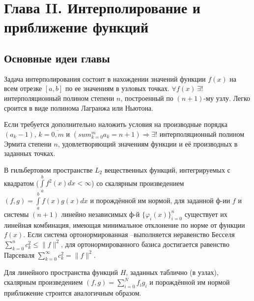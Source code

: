 \newpage
{}
\pagestyle{empty}
\vspace{0.5cm}

\section*{Глава II. Интерполирование и приближение функций}

\subsection{Основные идеи главы} 

    Задача интерполирования состоит в нахождении значений функции $f(x)$
    на всем отрезке $[a,b]$ по ее значениям в узловых точках. $\forall f(x)~\exists!$ интерполяционный полином степени $n$, построенный по $(n+1)$-му узлу. Легко сроится в виде полинома Лагранжа или Ньютона.

Если требуется дополнительно наложить условия на производные порядка $(a_k-1)$, $k = \overline{0,m}$ и $(sum_{k=0}^m a_k = n + 1) \Rightarrow \exists!$ интерполяционный полином Эрмита степени $n$, удовлетворяющий значениям функции и её производных в заданных точках.

В гильбертовом пространстве $L_2$ вещественных функций, интегрируемых с квадратом ($\int\limits_a^b{f^2(x)dx} < \infty$) со скалярным произведением $(f,g)=\int\limits_a^b{f(x)g(x)dx}$ и порождённой им нормой, для заданной ф-ии $f$ и системы $(n+1)$ линейно независимых ф-й $\{\varphi_i(x)\}_{i=0}^n$ существует их линейная комбинация, имеющая минимальное отклонение по норме от функции $f(x)$. Если система ортонормированная –выполняется неравенство Бесселя $\sum_{k=0}^n c_k^2 \leqslant \|f\|^2$, для ортонормированного базиса достигается равенство Парсеваля $\sum_{k=0}^\infty c_k^2 = \|f\|^2.$

Для линейного пространства функций $H$, заданных таблично (в узлах),  скалярным произведением $(f,g) = \sum\limits_{i=0}^N f_i g_i$ и порождённой им нормой приближение строится аналогичным образом.

\newpage


